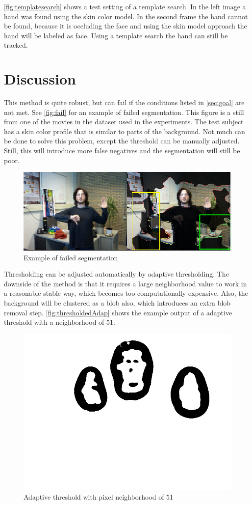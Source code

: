 \autoref{fig:templatesearch} shows a test setting of a template search. In the left image a hand was found using the skin color model. In the second frame the hand cannot be found, because it is occluding the face and using the skin model approach the hand will be labeled as face. Using a template search the hand can still be tracked.


\section{Discussion}
This method is quite robust, but can fail if the conditions listed in \autoref{sec:goal} are not met. See \autoref{fig:fail} for an example of failed segmentation. This figure is a still from one of the movies in the dataset used in the experiments. The test subject has a skin color profile that is similar to parts of the background. Not much can be done to solve this problem, except the threshold can be manually adjusted. Still, this will introduce more false negatives and the segmentation will still be poor.

\begin{figure}[tb]
\center{}
\includegraphics[width=0.8\linewidth]{figures/fail.png}
\caption{Example of failed segmentation}
\label{fig:fail}
\end{figure}

Thresholding can be adjusted automatically by adaptive thresholding. The downside of the method is that it requires a large neighborhood value to work in a reasonable stable way, which becomes too computationally expensive. Also, the background will be clustered as a blob also, which introduces an extra blob removal step. \autoref{fig:thresholdedAdap} shows the example output of a adaptive threshold with a neighborhood of 51.


\begin{figure}[tb]
\center{}
\includegraphics[width=0.3\linewidth]{figures/pipeline/thresholdedAdap.jpg}
\caption{Adaptive threshold with pixel neighborhood of 51}
\label{fig:thresholdedAdap}
\end{figure}






